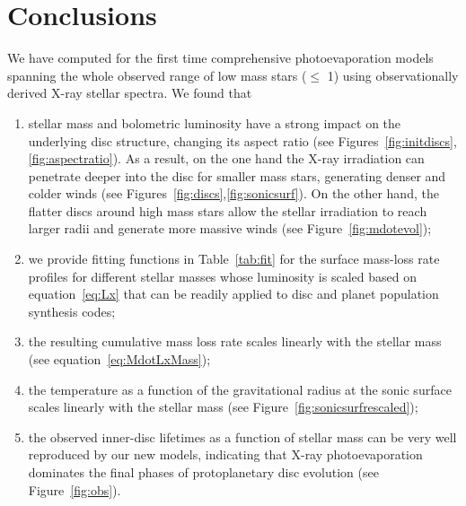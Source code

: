 \documentclass[usenatbib,useAMS,usedcolumn]{mnras}
\begin{document}
\section{Conclusions}\label{sec:conclusions}

  We have computed for the first time comprehensive photoevaporation models spanning the whole observed range of low mass stars ($\leq$ \SI{1}{\solarmass}) using observationally derived X-ray stellar spectra. 
  We found that

   \begin{enumerate}
      \item stellar mass and bolometric luminosity have a strong impact on the underlying disc structure, changing its aspect ratio (see Figures~\ref{fig:initdiscs},\ref{fig:aspectratio}). 
      As a result, on the one hand the X-ray irradiation can penetrate deeper into the disc for smaller mass stars, generating denser and colder winds (see Figures~\ref{fig:discs},\ref{fig:sonicsurf}). On the other hand, the flatter discs around high mass stars allow the stellar irradiation to reach larger radii and generate more massive winds (see Figure~\ref{fig:mdotevol});
      \item we provide fitting functions in Table~\ref{tab:fit} for the surface mass-loss rate profiles for different stellar masses whose luminosity is scaled based on equation~\ref{eq:Lx} that can be readily applied to disc and planet population synthesis codes;
      \item the resulting cumulative mass loss rate scales linearly with the stellar mass (see equation~\ref{eq:MdotLxMass});
      \item the temperature as a function of the gravitational radius at the sonic surface scales linearly with the stellar mass (see Figure~\ref{fig:sonicsurfrescaled});
      \item the observed inner-disc lifetimes as a function of stellar mass can be very well reproduced by our new models, indicating that X-ray photoevaporation dominates the final phases of protoplanetary disc evolution (see Figure~\ref{fig:obs}).
   \end{enumerate}
\end{document}
